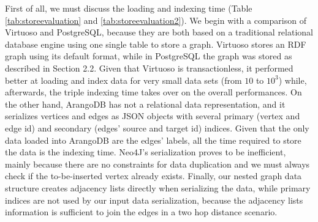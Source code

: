 First of all, we must discuss the  loading and indexing time (Table \ref{tab:storeevaluation} and \ref{tab:storeevaluation2}). We begin with a comparison of Virtuoso and PostgreSQL, because they are both based on a traditional relational database engine using one single table to store a graph. Virtuoso  stores an RDF graph using its default format, while in PostgreSQL the graph was stored as described in Section 2.2. Given that Virtuoso is transactionless, it performed better at loading and index data for very small data sets (from $10$ to $10^3$) while, afterwards, the triple indexing time takes over on the overall performances. On the other hand, ArangoDB has not a relational data representation, and it  serializes vertices and edges as JSON objects with several primary (vertex and edge id) and secondary (edges' source and target id) indices. Given that the only data loaded into ArangoDB are the edges' labels, all the time required to store the data is the indexing time. Neo4J's serialization proves to be inefficient, mainly because there are no constraints for data duplication and we must always check if the to-be-inserted vertex already exists. Finally, our nested graph data structure creates adjacency lists directly when serializing the data, while primary indices are not used by our input data serialization, because the adjacency lists information is sufficient to join the edges in a two hop distance scenario.

